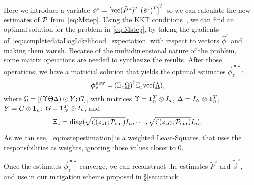 \documentclass{ifacconf}  %
\begin{document}
Here we introduce a variable ${\phi^{z}={[\vectorize{\tilde{P}^{z}}^{T}\ {(\tilde{\vec{s}}^{z})}^{T} ]}^{T}}$ so we can calculate the new estimates of $\mathcal{P}$ from~\eqref{eq:Mstep}. Using the KKT conditions~\cite{BoydVandenberghe2004}, we can find an optimal solution for the problem in~\eqref{eq:Mstep}, by
taking the gradients of~\eqref{eq:completedataLogLikelihood_expectation} with respect to vectors $\vec{\phi}^{z}$ and making them vanish.
Because of the multidimensional nature of the problem, some matrix operations are needed to synthesize the results.
After those operations, we have a matricial solution that yields the optimal estimates $\vec{\phi}_{z}^{\mathrm{new}}$:
\begin{equation}
  \label{eq:mstepestimation}
  \boldsymbol{\phi}_{z}^{\mathrm{new}}={(\Xi_{z}\underline{\Omega})}^{\dagger}\Xi_{z}\mathrm{vec} (\underline{\Lambda}),
\end{equation}
where
${\underline{\Omega}=[(\Upsilon \underline{\Theta}\Delta)\odot Y;G]}$,
with matrices
${\Upsilon=\mathbf{1}_{n}^{T}\otimes I_{n}}$,
${\Delta=I_{N}\otimes\mathbf{1}_{n}^{T}}$,
${Y=G\otimes\mathbf{1}_{n}}$,
${G=\mathbf{1}_{N}^{T}\otimes I_{n}}$,
and
\[{\Xi_{z}={\operatorname{diag}(\sqrt{{\zeta(z_{z1};\mathcal{P}_{\mathrm{cur}})}}I_{n},\cdots,\sqrt{{\zeta(z_{zO};\mathcal{P}_{\mathrm{cur}})}}I_{n})}}.\]

As we can see,~\eqref{eq:mstepestimation} is a weighted Least-Squares, that uses the responsibilities as weights, ignoring those values closer to $0$.

Once the estimates $\vec{\phi}_{z}^{\mathrm{new}}$ converge, we can reconstruct the estimates $\tilde{P}^{z}$ and $\tilde{\vec{s}}^{z}$, and use in our mitigation scheme proposed in \S\ref{sec:attack}.



\end{document}
